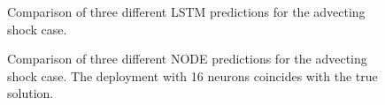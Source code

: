 \documentclass[preprint,12pt]{elsarticle}
\begin{document}
\begin{figure}
	\centering
	\caption{Comparison of three different LSTM predictions for the advecting shock case.}
	\label{Figure5}
\end{figure}

\begin{figure}
	\centering
	\caption{Comparison of three different NODE predictions for the advecting shock case. The deployment with 16 neurons coincides with the true solution.}
	\label{Figure6}
\end{figure}
\end{document}
